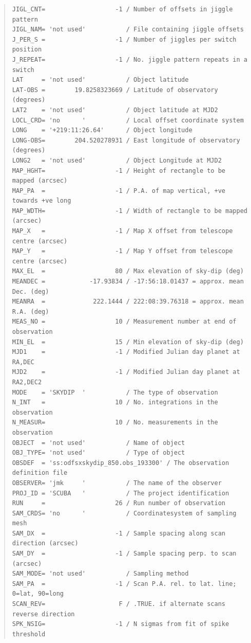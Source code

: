 \documentclass[twoside,11pt]{article}
\newenvironment{myquote}{\begin{quote}\begin{small}}{\end{small}\end{quote}}
\renewcommand{\_}{\texttt{\symbol{95}}}
\begin{document}
\begin{myquote}
\begin{verbatim}
JIGL_CNT=                   -1 / Number of offsets in jiggle pattern
JIGL_NAM= 'not used'           / File containing jiggle offsets
J_PER_S =                   -1 / Number of jiggles per switch position
J_REPEAT=                   -1 / No. jiggle pattern repeats in a switch
LAT     = 'not used'           / Object latitude
LAT-OBS =        19.8258323669 / Latitude of observatory (degrees)
LAT2    = 'not used'           / Object latitude at MJD2
LOCL_CRD= 'no      '           / Local offset coordinate system
LONG    = '+219:11:26.64'      / Object longitude
LONG-OBS=        204.520278931 / East longitude of observatory (degrees)
LONG2   = 'not used'           / Object Longitude at MJD2
MAP_HGHT=                   -1 / Height of rectangle to be mapped (arcsec)
MAP_PA  =                   -1 / P.A. of map vertical, +ve towards +ve long
MAP_WDTH=                   -1 / Width of rectangle to be mapped (arcsec)
MAP_X   =                   -1 / Map X offset from telescope centre (arcsec)
MAP_Y   =                   -1 / Map Y offset from telescope centre (arcsec)
MAX_EL  =                   80 / Max elevation of sky-dip (deg)
MEANDEC =            -17.93834 / -17:56:18.01437 = approx. mean Dec. (deg)
MEANRA  =             222.1444 / 222:08:39.76318 = approx. mean R.A. (deg)
MEAS_NO =                   10 / Measurement number at end of observation
MIN_EL  =                   15 / Min elevation of sky-dip (deg)
MJD1    =                   -1 / Modified Julian day planet at RA,DEC
MJD2    =                   -1 / Modified Julian day planet at RA2,DEC2
MODE    = 'SKYDIP  '           / The type of observation
N_INT   =                   10 / No. integrations in the observation
N_MEASUR=                   10 / No. measurements in the observation
OBJECT  = 'not used'           / Name of object
OBJ_TYPE= 'not used'           / Type of object
OBSDEF  = 'ss:odfsxskydip_850.obs_193300' / The observation definition file
OBSERVER= 'jmk     '           / The name of the observer
PROJ_ID = 'SCUBA   '           / The project identification
RUN     =                   26 / Run number of observation
SAM_CRDS= 'no      '           / Coordinatesystem of sampling mesh
SAM_DX  =                   -1 / Sample spacing along scan direction (arcsec)
SAM_DY  =                   -1 / Sample spacing perp. to scan (arcsec)
SAM_MODE= 'not used'           / Sampling method
SAM_PA  =                   -1 / Scan P.A. rel. to lat. line; 0=lat, 90=long
SCAN_REV=                    F / .TRUE. if alternate scans reverse direction
SPK_NSIG=                   -1 / N sigmas from fit of spike threshold

\end{verbatim}
\end{myquote}
\end{document}
